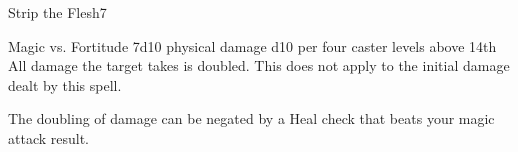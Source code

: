 \begin{spellsection}{Strip the Flesh}{7}
\begin{spellheader}
    \begin{spelltargetinginfo}
    \end{spelltargetinginfo}
\end{spellheader}
\begin{spellcontent}
    \begin{spelleffects}
        \begin{spellattack}{Magic vs. Fortitude}
            \spelleffect 7d10 physical damage \add d10 per four caster levels above 14th
            \spellsuccess All damage the target takes is doubled. This does not apply to the initial damage dealt by this spell.
        \end{spellattack}
        \spelldur \durshort
    \end{spelleffects}
\end{spellcontent}
\begin{spellfooter}
    \spellnotes The doubling of damage can be negated by a Heal check that beats your magic attack result.
\end{spellfooter}
\end{spellsection}

